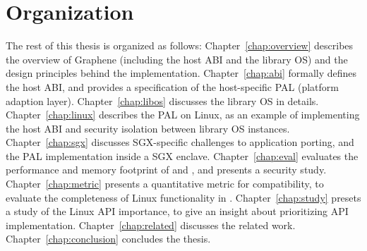 \section{Organization}

The rest of this thesis is organized as follows:
Chapter~\ref{chap:overview} describes the overview of Graphene (including the host ABI and the library OS) and the design principles behind the implementation.
Chapter~\ref{chap:abi} formally defines the host ABI, and provides a specification of the host-specific PAL (platform adaption layer).
Chapter~\ref{chap:libos} discusses the library OS in details.
Chapter~\ref{chap:linux} describes the PAL on Linux, as an example of implementing the host ABI and security isolation between library OS instances.
Chapter~\ref{chap:sgx} discusses SGX-specific challenges to application porting, and the PAL implementation inside a SGX enclave.
Chapter~\ref{chap:eval} evaluates the performance and memory footprint of \graphene{} and \graphenesgx{},
and presents a security study.
Chapter~\ref{chap:metric} presents a quantitative metric for compatibility,
to evaluate the completeness of Linux functionality in \graphene{}.
Chapter~\ref{chap:study} presets a study of the Linux API importance, to give an insight about prioritizing API implementation.
Chapter~\ref{chap:related} discusses the related work.
Chapter~\ref{chap:conclusion} concludes the thesis.
